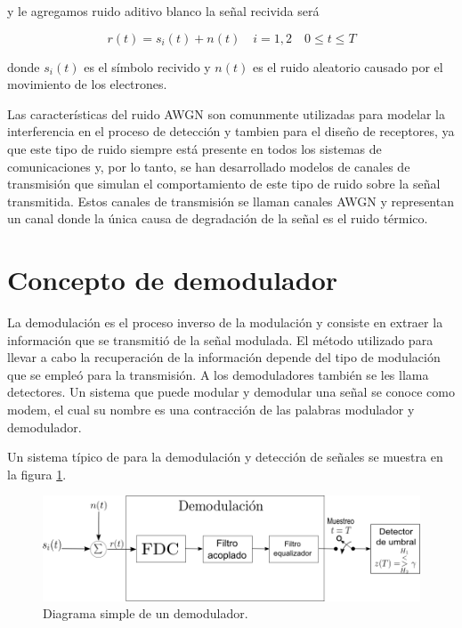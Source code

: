 y le agregamos ruido aditivo blanco la se\~nal recivida ser\'a

\begin{equation}\label{eq:signoise}
r(t)=s_i(t)+n(t) \quad i=1,2 \quad 0\leq t \leq T
\end{equation}

donde $s_i(t)$ es el s\'imbolo recivido y $n(t)$ es el ruido aleatorio causado por el movimiento de
los electrones.

Las caracter\'isticas del ruido AWGN son comunmente utilizadas para modelar la interferencia en
el proceso de detecci\'on y tambien para el dise\~no de receptores, ya que este tipo de ruido
siempre est\'a presente en todos los sistemas de comunicaciones y, por lo tanto, se han desarrollado
modelos de canales de transmisi\'on que simulan el comportamiento de este tipo de ruido sobre la
se\~nal transmitida. Estos canales de transmisi\'on se llaman canales AWGN y representan un canal
donde la \'unica causa de degradaci\'on de la se\~nal es el ruido t\'ermico.

\section{Concepto de demodulador}

La demodulaci\'on es el proceso inverso de la modulaci\'on y consiste en
extraer la informaci\'on que se transmiti\'o de la se\~nal modulada. El m\'etodo
utilizado para llevar a cabo la recuperaci\'on de la informaci\'on depende del
tipo de modulaci\'on que se emple\'o para la transmisi\'on. A los demoduladores
tambi\'en se les llama detectores. Un sistema que puede modular y demodular una
se\~nal se conoce como modem, el cual su nombre es una contracci\'on de las
palabras modulador y demodulador. 

Un sistema t\'ipico de para la demodulaci\'on y detecci\'on de se\~nales se muestra en la
figura \ref{fig:simpledemod}. 

\begin{figure}[ht]
\centering
	\includegraphics[scale=0.5]{figs/simpledemod}
	\caption{Diagrama simple de un demodulador.}
	\label{fig:simpledemod}
\end{figure}

